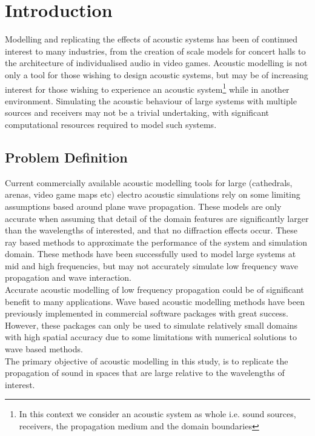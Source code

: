 \chapter{Introduction}

Modelling and replicating the effects of acoustic systems has been of continued interest to many industries, from the creation of scale models for concert halls to the architecture of individualised audio in video games. Acoustic modelling is not only a tool for those wishing to design acoustic systems, but may be of increasing interest for those wishing to experience an acoustic system\footnote{In this context we consider an acoustic system as whole i.e. sound sources, receivers, the propagation medium and the domain boundaries} while in another environment. Simulating the acoustic behaviour of large systems with multiple sources and receivers may not be a trivial undertaking, with significant computational resources required to model such systems. 

\section{Problem Definition}

Current commercially available acoustic modelling tools for large (cathedrals, arenas, video game maps etc) electro acoustic simulations rely on some limiting assumptions based around plane wave propagation. These models are only accurate when assuming that detail of the domain features are significantly larger than the wavelengths of interested, and that no diffraction effects occur. These ray based methods to approximate the performance of the system and simulation domain. These methods have been successfully used to model large systems at mid and high frequencies, but may not accurately simulate low frequency wave propagation and wave interaction.\\

Accurate acoustic modelling of low frequency propagation could be of significant benefit to many applications. Wave based acoustic modelling methods have been previously implemented in commercial software packages with great success. However, these packages can only be used to simulate relatively small domains with high spatial accuracy due to some limitations with numerical solutions to wave based methods. \\

 The primary objective of acoustic modelling in this study, is to replicate the propagation of sound in spaces that are large relative to the wavelengths of interest.

